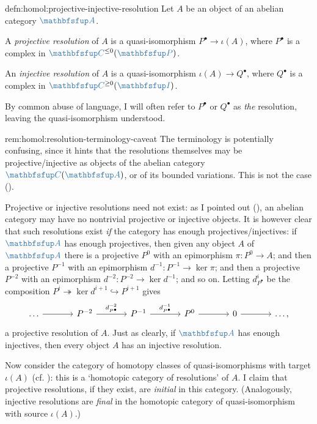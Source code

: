 \begin{defn}{}{defn:homol:projective-injective-resolution}
  Let $A$ be an object of an abelian category $\categ{A}$.

  A \emph{projective resolution} of $A$ is a quasi-isomorphism
  $P^\bullet \to \iota(A)$, where $P^\bullet$ is a complex in
  $\categ{C}^{\le 0}(\categ{P})$.

  An \emph{injective resolution} of $A$ is a quasi-isomorphism
  $\iota(A) \to Q^\bullet$, where $Q^\bullet$ is a complex in
  $\categ{C}^{\ge 0}(\categ{I})$.
\end{defn}

By common abuse of language, I will often refer to $P^\bullet$ or
$Q^\bullet$ as \emph{the} resolution, leaving the quasi-isomorphism
understood.

\begin{rem}{}{rem:homol:resolution-terminology-caveat}
  The terminology is potentially confusing, since it hints that the
  resolutions themselves may be projective/injective as objects of the
  abelian category $\categ{C}(\categ{A})$, or of its bounded
  variations. This is not the case
  ().
\end{rem}

Projective or injective resolutions need not exist: as I pointed out
(), an abelian category may have no nontrivial
projective or injective objects. It is however clear that such
resolutions exist \emph{if} the category has enough
projectives/injectives: if $\categ{A}$ has enough projectives, then
given any object $A$ of $\categ{A}$ there is a projective $P^0$ with
an epimorphism $\pi : P^0 \to A$; and then a projective $P^{-1}$ with
an epimorphism $d^{-1} : P^{-1} \to \ker\pi$; and then a projective
$P^{-2}$ with an epimorphism $d^{-2} : P^{-2} \to \ker d^{-1}$; and so
on. Letting $d^i_{P^\bullet}$ be the composition
$P^i \twoheadrightarrow \ker d^{i+1} \hookrightarrow P^{i+1}$ gives
\[\begin{tikzcd}[column sep=large]
    \dots \arrow[r] & P^{-2} \arrow[r, "d_{P^\bullet}^{-2}"] & P^{-1}
    \arrow[r, "d_{P^\bullet}^{-1}"] & P^0 \arrow[r] & 0 \arrow[r] &
    \dots,
  \end{tikzcd}\] a projective resolution of $A$. Just as clearly, if
$\categ{A}$ has enough injectives, then every object $A$ has an
injective resolution.

Now consider the category of homotopy classes of quasi-isomorphisms
with target $\iota(A)$ (cf. ): this is a `homotopic
category of resolutions' of $A$. I claim that projective resolutions,
if they exist, are \emph{initial} in this category.  (Analogously,
injective resolutions are \emph{final} in the homotopic category of
quasi-isomorphism with source $\iota(A)$.)

